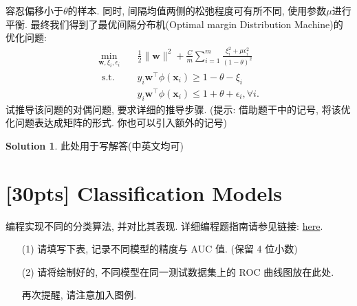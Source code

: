 \documentclass[a4paper,UTF8]{article}
\numberwithin{equation}{section}
\theoremstyle{definition}
\newtheorem*{solution}{Solution}
\def \x {\boldsymbol{x}}
\begin{document}
\begin{enumerate}
    容忍偏移小于$\theta$的样本. 同时, 间隔均值两侧的松弛程度可有所不同, 使用参数$\mu$进行平衡. 最终我们得到了最优间隔分布机(Optimal margin Distribution Machine)的优化问题:
    \begin{align*}
        \min _{\boldsymbol{w}, \xi_i, \epsilon_i} & \quad \frac{1}{2}\|\boldsymbol{w}\|^2+ \frac{C}{m} \sum_{i=1}^m \frac{\xi_i^2+\mu \epsilon_i^2}{(1-\theta)^2} \\
        \text { s.t. } & \quad y_i \boldsymbol{w}^{\top} \phi\left(\x_i\right) \geq 1-\theta-\xi_i \\
        & \quad y_i \boldsymbol{w}^{\top} \phi\left(\x_i\right) \leq 1+\theta+\epsilon_i, \forall i.
    \end{align*}
    试推导该问题的对偶问题, 要求详细的推导步骤.
    (提示: 借助题干中的记号, 将该优化问题表达成矩阵的形式. 你也可以引入额外的记号)
\end{enumerate}

\begin{solution}
	此处用于写解答(中英文均可)
	~\\
\end{solution}

\newpage

\section{[30pts] Classification Models}
编程实现不同的分类算法, 并对比其表现. 详细编程题指南请参见链接: \href{https://www.lamda.nju.edu.cn/ML2023Spring/homework/hw3/hw3-code.html}{here}.
\begin{enumerate}
    \item[(1)] 请填写下表, 记录不同模型的精度与 AUC 值. (保留 4 位小数)
    \item[(2)] 请将绘制好的, 不同模型在同一测试数据集上的 ROC 曲线图放在此处. 
	
	再次提醒, 请注意加入图例.
\end{enumerate}
\end{document}
